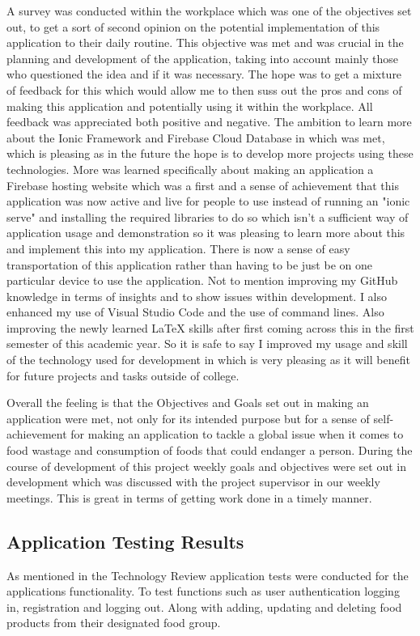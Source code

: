 A survey was conducted within the workplace which was one of the objectives set out, to get a sort of second opinion on the potential implementation of this application to their daily routine. This objective was met and was crucial in the planning and development of the application, taking into account mainly those who questioned the idea and if it was necessary. The hope was to get a mixture of feedback for this which would allow me to then suss out the pros and cons of making this application and potentially using it within the workplace. All feedback was appreciated both positive and negative. 
\newline
\newpage
The ambition to learn more about the Ionic Framework and Firebase Cloud Database in which was met, which is pleasing as in the future the hope is to develop more projects using these technologies. More was learned specifically about making an application a Firebase hosting website which was a first and a sense of achievement that this application was now active and live for people to use instead of running an "ionic serve" and installing the required libraries to do so which isn't a sufficient way of application usage and demonstration so it was pleasing to learn more about this and implement this into my application. There is now a sense of easy transportation of this application rather than having to be just be on one particular device to use the application. Not to mention improving my GitHub knowledge in terms of insights and to show issues within development. I also enhanced my use of Visual Studio Code and the use of command lines. Also improving the newly learned LaTeX skills after first coming across this in the first semester of this academic year. So it is safe to say I improved my usage and skill of the technology used for development in which is very pleasing as it will benefit for future projects and tasks outside of college. 
\newline

Overall the feeling is that the Objectives and Goals set out in making an application were met, not only for its intended purpose but for a sense of self-achievement for making an application to tackle a global issue when it comes to food wastage and consumption of foods that could endanger a person. During the course of development of this project weekly goals and objectives were set out in development which was discussed with the project supervisor in our weekly meetings. This is great in terms of getting work done in a timely manner.

\subsection{Application Testing Results}
As mentioned in the Technology Review application tests were conducted for the applications functionality. To test functions such as user authentication logging in, registration and logging out. Along with adding, updating and deleting food products from their designated food group. 
\newline

